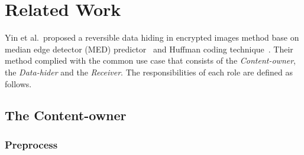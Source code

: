 \section{Related Work}
\label{sec:related}


Yin et al.\ proposed a reversible data hiding in encrypted images method base on median edge detector (MED) predictor~\cite{Weinberger2000} and Huffman coding technique~\cite{IRE1952}.
Their method complied with the common use case that consists of the \emph{Content-owner}, the \emph{Data-hider} and the \emph{Receiver}.
The responsibilities of each role are defined as follows.





\subsection{The Content-owner}

\subsubsection{Preprocess}

